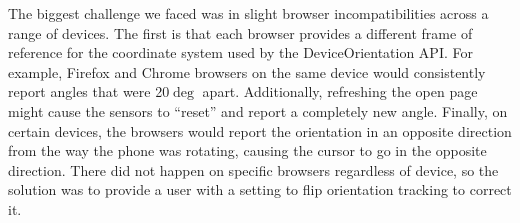 The biggest challenge we faced was in slight browser
incompatibilities across a range of devices. The first is that
each browser provides a different frame of reference for the
coordinate system used by the DeviceOrientation API. For example,
Firefox and Chrome browsers on the same device would consistently
report angles that were 20$\deg$ apart. Additionally, refreshing
the open page might cause the sensors to ``reset'' and report
a completely new angle. Finally, on certain devices, the browsers
would report the orientation in an opposite direction from the way
the phone was rotating, causing the cursor to go in the opposite
direction. There did not happen on specific browsers regardless of
device, so the solution was to provide a user with a setting to
flip orientation tracking to correct it.
